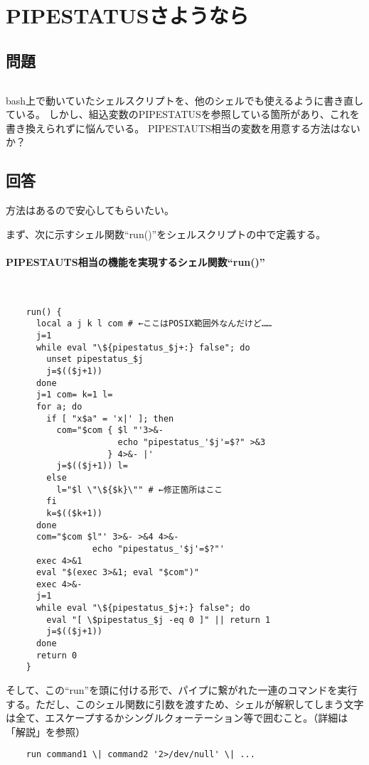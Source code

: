 \section{PIPESTATUSさようなら}
\label{recipe:Sayonara_PIPESTATUS}

\subsection*{問題}
\noindent
$\!\!\!\!\!$
\begin{grshfboxit}{160.0mm}
	bash上で動いていたシェルスクリプトを、他のシェルでも使えるように書き直している。
	しかし、組込変数のPIPESTATUSを参照している箇所があり、これを書き換えられずに悩んでいる。
	PIPESTAUTS相当の変数を用意する方法はないか？
\end{grshfboxit}

\subsection*{回答}
方法はあるので安心してもらいたい。

まず、次に示すシェル関数``run()''をシェルスクリプトの中で定義する。

\paragraph{PIPESTAUTS相当の機能を実現するシェル関数``run()''} 　\\
\begin{frameboxit}{160.0mm}
\begin{verbatim}
	run() {
	  local a j k l com # ←ここはPOSIX範囲外なんだけど……
	  j=1
	  while eval "\${pipestatus_$j+:} false"; do
	    unset pipestatus_$j
	    j=$(($j+1))
	  done
	  j=1 com= k=1 l=
	  for a; do
	    if [ "x$a" = 'x|' ]; then
	      com="$com { $l "'3>&-
	                  echo "pipestatus_'$j'=$?" >&3
	                } 4>&- |'
	      j=$(($j+1)) l=
	    else
	      l="$l \"\${$k}\"" # ←修正箇所はここ
	    fi
	    k=$(($k+1))
	  done
	  com="$com $l"' 3>&- >&4 4>&-
	             echo "pipestatus_'$j'=$?"'
	  exec 4>&1
	  eval "$(exec 3>&1; eval "$com")"
	  exec 4>&-
	  j=1
	  while eval "\${pipestatus_$j+:} false"; do
	    eval "[ \$pipestatus_$j -eq 0 ]" || return 1
	    j=$(($j+1))
	  done
	  return 0
	}
\end{verbatim}
\end{frameboxit}

そして、この``run''を頭に付ける形で、パイプに繋がれた一連のコマンドを実行する。ただし、このシェル関数に引数を渡すため、シェルが解釈してしまう文字は全て、エスケープするかシングルクォーテーション等で囲むこと。（詳細は「解説」を参照）\\
\begin{frameboxit}{160.0mm}
\begin{verbatim}
	run command1 \| command2 '2>/dev/null' \| ...
\end{verbatim}
\end{frameboxit}

